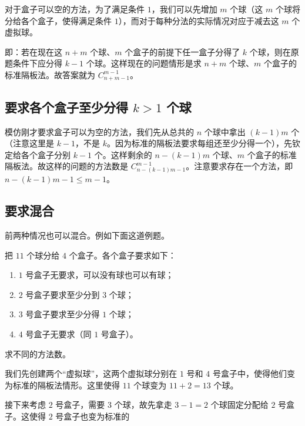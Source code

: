 
对于盒子可以空的方法，为了满足条件 $1$，我们可以先增加 $m$ 个球（这 $m$ 个球将分给各个盒子，使得满足条件 $1$），而对于每种分法的实际情况对应于减去这 $m$ 个虚拟球。

即：若在现在这 $n+m$ 个球、$m$ 个盒子的前提下任一盒子分得了 $k$ 个球，则在原题条件下应分得 $k-1$ 个球。这样现在的问题情形是求 $n+m$ 个球、$m$ 个盒子的标准隔板法。故答案就为 $C_{n+m-1}^{m-1}$。

\subsection{要求各个盒子至少分得 $k > 1$ 个球}
模仿刚才要求盒子可以为空的方法，我们先从总共的 $n$ 个球中拿出 $(k-1)m$ 个（注意这里是 $k-1$，不是 $k$。因为标准的隔板法要求每组还至少分得一个），先钦定给各个盒子分别 $k-1$ 个。这样剩余的 $n-(k-1)m$ 个球、$m$ 个盒子的标准隔板法。故这样的问题的方法数是 $C_{n-(k-1)m-1}^{m-1}$。注意要求存在一个方法，即 $n-(k-1)m-1 \le m-1$。

\subsection{要求混合}
前两种情况也可以混合。例如下面这道例题。
\begin{example}{}
把 $11$ 个球分给 $4$ 个盒子。各个盒子要求如下：
\begin{enumerate}
\item $1$ 号盒子无要求，可以没有球也可以有球；
\item $2$ 号盒子要求至少分到 $3$ 个球；
\item $3$ 号盒子要求至少分得 $1$ 个球；
\item $4$ 号盒子无要求（同 $1$ 号盒子）。
\end{enumerate}
求不同的方法数。
\end{example}
我们先创建两个“虚拟球”，这两个虚拟球分别在 $1$ 号和 $4$ 号盒子中，使得他们变为标准的隔板法情形。这里使得 $11$ 个球变为 $11+2 = 13$ 个球。

接下来考虑 $2$ 号盒子，需要 $3$ 个球，故先拿走 $3-1=2$ 个球固定分配给 $2$ 号盒子。这使得 $2$ 号盒子也变为标准的